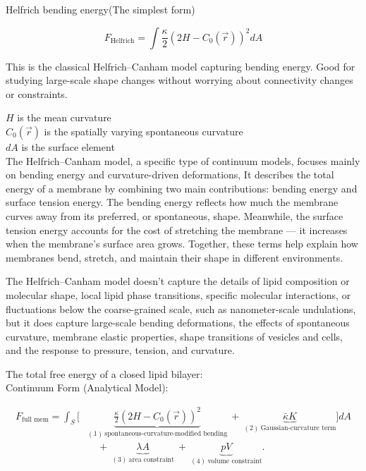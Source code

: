 \documentclass[12pt]{article}
\begin{document}
\begin{flushleft}
 

Helfrich bending energy(The simplest form)

\vspace{-1em} 


\begin{equation}
F_{\text{Helfrich}} = \int \frac{\kappa}{2} \left( 2H - C_0(\vec{r}) \right)^2 dA
\end{equation}

This is the classical Helfrich–Canham model capturing bending energy. Good for studying large-scale shape changes without worrying about connectivity changes or constraints.


\( H \) is the mean curvature\\
\( C_0(\vec{r}) \) is the spatially varying spontaneous curvature\\
\( dA \) is the surface element\\

The Helfrich–Canham model, a specific type of continuum models, focuses mainly on bending energy and curvature-driven deformations, It describes the total energy of a membrane by combining two main contributions: bending energy and surface tension energy. The bending energy reflects how much the membrane curves away from its preferred, or spontaneous, shape. Meanwhile, the surface tension energy accounts for the cost of stretching the membrane — it increases when the membrane's surface area grows. Together, these terms help explain how membranes bend, stretch, and maintain their shape in different environments.

The Helfrich–Canham model doesn't capture the details of lipid composition or molecular shape, local lipid phase transitions, specific molecular interactions, or fluctuations below the coarse-grained scale, such as nanometer-scale undulations, but it does capture large-scale bending deformations, the effects of spontaneous curvature, membrane elastic properties, shape transitions of vesicles and cells, and the response to pressure, tension, and curvature.


The total free energy of a closed lipid bilayer:\\
Continuum Form (Analytical Model):
\vspace{-1em}


\begin{align}
F_\text{full mem} = \int_S \Bigg[
&\underbrace{\frac{\kappa}{2} \left(2H - C_0(\vec{r}) \right)^2}_{(1)\ \text{spontaneous-curvature-modified bending}} 
\ + \ 
\underbrace{\bar{\kappa} K}_{(2)\ \text{Gaussian-curvature term}} 
\Bigg] dA \nonumber \\
&\quad + \ 
\underbrace{\lambda A}_{(3)\ \text{area constraint}} 
\ + \ 
\underbrace{p V}_{(4)\ \text{volume constraint}}.
\end{align}





\end{flushleft}
\end{document}

